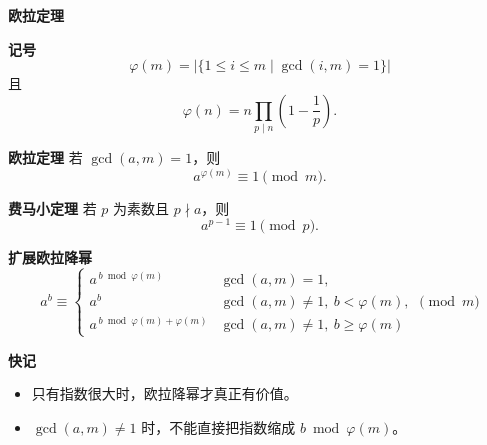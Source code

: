 \textbf{欧拉定理}

\textbf{记号}
\[
\varphi(m)=|\{1\le i\le m\mid \gcd(i,m)=1\}|
\]
且
\[
\varphi(n)=n\prod_{p\mid n}\left(1-\frac{1}{p}\right).
\]

\textbf{欧拉定理}
若 $\gcd(a,m)=1$，则
\[
a^{\varphi(m)}\equiv 1\pmod m.
\]

\textbf{费马小定理}
若 $p$ 为素数且 $p\nmid a$，则
\[
a^{p-1}\equiv 1\pmod p.
\]

\textbf{扩展欧拉降幂}
\[
a^b \equiv
\begin{cases}
a^{\,b\bmod \varphi(m)} & \gcd(a,m)=1,\\
a^b & \gcd(a,m)\ne 1,\ b<\varphi(m),\\
a^{\,b\bmod \varphi(m)+\varphi(m)} & \gcd(a,m)\ne 1,\ b\ge \varphi(m)
\end{cases}
\pmod m
\]

\textbf{快记}
\begin{itemize}
\item 只有指数很大时，欧拉降幂才真正有价值。
\item $\gcd(a,m)\ne 1$ 时，不能直接把指数缩成 $b\bmod \varphi(m)$。
\end{itemize}
